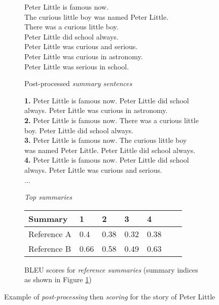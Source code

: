 \begin{figure}[H]
\begin{subfigure}{\textwidth}
\begin{displayquote}
Peter Little is famous now.\\
The curious little boy was named Peter Little.\\
There was a curious little boy.\\
Peter Little did school always.\\
Peter Little was curious and serious.\\
Peter Little was curious in astronomy.\\
Peter Little was serious in school.
\end{displayquote}
\caption{Post-processed \textit{summary sentences}}
\end{subfigure}
\begin{subfigure}{\textwidth}
\vspace{\baselineskip}
\begin{displayquote}
\textbf{1.} Peter Little is famous now. Peter Little did school always. Peter Little was curious in astronomy.\\
\textbf{2.} Peter Little is famous now. There was a curious little boy. Peter Little did school always.\\
\textbf{3.} Peter Little is famous now. The curious little boy was named Peter Little. Peter Little did school always.\\
\textbf{4.} Peter Little is famous now. Peter Little did school always. Peter Little was curious and serious.\\
...
\end{displayquote}
\caption{\textit{Top summaries}}
\label{fig:top_score_summaries_example}
\end{subfigure}
\begin{subfigure}{\textwidth}
\vspace{\baselineskip}
\centering
\begin{tabular}{@{}lllllll@{}}
\toprule
Summary     & 1    & 2    & 3    & 4    \\ \midrule
Reference A & 0.4  & 0.38 & 0.32 & 0.38  \\
Reference B & 0.66 & 0.58 & 0.49 & 0.63 \\ \bottomrule
\end{tabular}\caption{BLEU scores for \textit{reference summaries} (summary indices as shown in Figure \ref{fig:top_score_summaries_example})}
\end{subfigure}
\caption{Example of \textit{post-processing} then \textit{scoring} for the story of Peter Little}
\label{fig:postprocess_score_example}
\end{figure}

